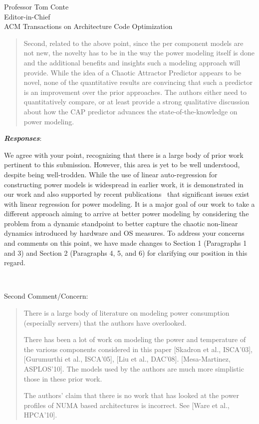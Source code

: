 \documentclass[10pt]{letter} %
\newenvironment{rviewcomment}
{~\\%
\begin{bfseries}}
{\end{bfseries}}
\newcommand{\rviewresponses}{\textbf{\textit{Responses}}:}
\begin{document}
\begin{letter}{Professor Tom Conte \\
Editor-in-Chief \\
ACM Transactions on Architecture Code Optimization }
\begin{quote}
\begin{itshape}
  Second, related to the above point, since the per component models are
  not new, the novelty has to be in the way the power modeling itself is
  done and the additional benefits and insights such a modeling approach
  will provide. While the idea of a Chaotic Attractor Predictor appears
  to be novel, none of the quantitative results are convincing that such
  a predictor is an improvement over the prior approaches. The authors
  either need to quantitatively compare, or at least provide a strong
  qualitative discussion about how the CAP predictor advances the
  state-of-the-knowledge on power modeling.
\end{itshape}
\end{quote}

\rviewresponses

We agree with your point, recognizing that there is a large body of
prior work pertinent to this submission.  However, this area is yet to
be well understood, despite being well-trodden.  While the use of linear
auto-regression for constructing power models is widespread in earlier
work, it is demonstrated in our work and also supported by recent
publications~\cite{Kansal2010,Tsirogiannis2010,McCullough2011,Hsu2011}
that significant issues exist with linear regression for power modeling.
It is a major goal of our work to take a different approach aiming to
arrive at better power modeling by considering the problem from a
dynamic standpoint to better capture the chaotic non-linear dynamics
introduced by hardware and OS measures.  To address your concerns and
comments on this point, we have made changes to Section 1 (Paragraphs 1
and 3) and Section 2 (Paragraphs 4, 5, and 6) for clarifying our position
in this regard.

\begin{rviewcomment}
  Second Comment/Concern:
\end{rviewcomment}
\begin{quote}
  \begin{itshape}
    There is a large body of literature on modeling power consumption
    (especially servers) that the authors have overlooked.

    There has been a lot of work on modeling the power and temperature
    of the various components considered in this paper [Skadron et al.,
    ISCA'03], [Gurumurthi et al., ISCA'05], [Liu et al.,
    DAC'08]. [Mesa-Martinez, ASPLOS'10]. The models used by the authors
    are much more simplistic those in these prior work.

    The authors' claim that there is no work that has looked at the
    power profiles of NUMA based architectures is incorrect. See [Ware
    et al., HPCA'10].


\end{itshape}
\end{quote}
\end{letter}
\end{document}

